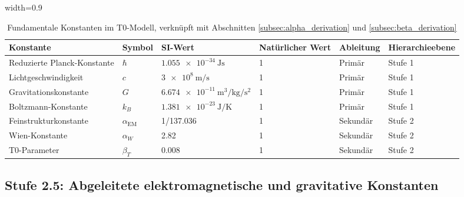 \documentclass[12pt,a4paper]{article}
\newcommand{\tablescale}{0.9}
\begin{document}
	\begin{table}[htbp]
		\centering
		\begin{adjustbox}{width=\tablescale\textwidth}
			\begin{tabular}{llllll}
				\toprule
				\textbf{Konstante} & \textbf{Symbol} & \textbf{SI-Wert} & \textbf{Natürlicher Wert} & \textbf{Ableitung} & \textbf{Hierarchieebene} \\
				\midrule
				Reduzierte Planck-Konstante & \(\hbar\) & \(\SI{1.055e-34}{\joule\second}\) & 1 & Primär & Stufe 1 \\
				Lichtgeschwindigkeit & \(c\) & \(\SI{3e8}{\meter\per\second}\) & 1 & Primär & Stufe 1 \\
				Gravitationskonstante & \(G\) & \(\SI{6.674e-11}{\meter\cubed\per\kilogram\per\second\squared}\) & 1 & Primär & Stufe 1 \\
				Boltzmann-Konstante & \(k_B\) & \(\SI{1.381e-23}{\joule\per\kelvin}\) & 1 & Primär & Stufe 1 \\
				Feinstrukturkonstante & \(\alpha_{\text{EM}}\) & 1/137.036 & 1 & Sekundär & Stufe 2 \\
				Wien-Konstante & \(\alpha_W\) & 2.82 & 1 & Sekundär & Stufe 2 \\
				T0-Parameter & \(\beta_T\) & 0.008 & 1 & Sekundär & Stufe 2 \\
				\bottomrule
			\end{tabular}
		\end{adjustbox}
		\caption{Fundamentale Konstanten im T0-Modell, verknüpft mit Abschnitten \ref{subsec:alpha_derivation} und \ref{subsec:beta_derivation}}
		\label{tab:fund_const}
	\end{table}
	
	\subsection{Stufe 2.5: Abgeleitete elektromagnetische und gravitative Konstanten}
	\label{subsec:level2.5}
	
\end{document}

